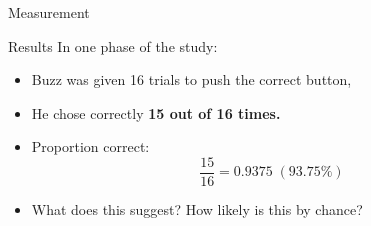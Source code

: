 \documentclass[slidestop,compress,mathserif]{beamer}
\begin{document}
\begin{frame}{Measurement}
    \begin{block}{Results}
        In one phase of the study:
        \begin{itemize}
            \item Buzz was given 16 trials to push the correct button,
            \item He chose correctly \textbf{15 out of 16 times.}
        \end{itemize}
    \end{block}
    \vspace{0.3cm}
    \begin{itemize}
        \item Proportion correct: \[\frac{15}{16} = 0.9375\; (93.75\%)\]
        \item What does this suggest? How likely is this by chance?
    \end{itemize}
    \vspace{0.5cm}
    \begin{center}
    \end{center}
\end{frame}

\end{document}
